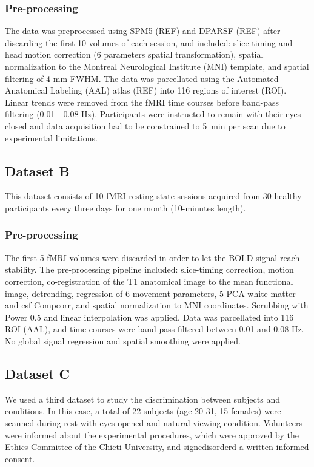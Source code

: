 \documentclass{article}
\begin{document}
\subsubsection{Pre-processing}

The data was preprocessed using SPM5 (REF) and DPARSF (REF) after discarding the first 10 volumes of each session, and included: slice timing and head motion correction (6 parameters spatial transformation), spatial normalization to the Montreal Neurological Institute (MNI) template, and spatial filtering of 4 mm FWHM. The data was parcellated using the Automated Anatomical Labeling (AAL) atlas (REF) into 116 regions of interest (ROI). Linear trends were removed from the fMRI time courses before band-pass filtering (0.01 - 0.08 Hz). Participants were instructed to remain with their eyes closed and data acquisition had to be constrained to 5~min per scan due to experimental limitations. 

\subsection{Dataset B}

This dataset consists of 10 fMRI resting-state sessions acquired from 30 healthy participants every three days for one month (10-minutes length). 

\subsubsection{Pre-processing}

The first 5 fMRI volumes were discarded in order to let the BOLD signal reach stability. The pre-processing pipeline included: slice-timing correction, motion correction, co-registration of the T1 anatomical image to the mean functional image, detrending, regression of 6 movement parameters, 5 PCA white matter and csf Compcorr, and spatial normalization to MNI coordinates. Scrubbing with Power 0.5 and linear interpolation was applied. Data was parcellated into 116 ROI (AAL), and time courses were band-pass filtered between 0.01 and 0.08 Hz. No global signal regression and spatial smoothing were applied. 

\subsection{Dataset C}

We used a third dataset to study the discrimination between subjects and conditions. In this case, a total of 22 subjects (age 20-31, 15 females) were scanned during rest with eyes opened and natural viewing condition. Volunteers were informed about the experimental procedures, which were approved by the Ethics Committee of the Chieti University, and signedisorderd a written informed consent.
\end{document}
